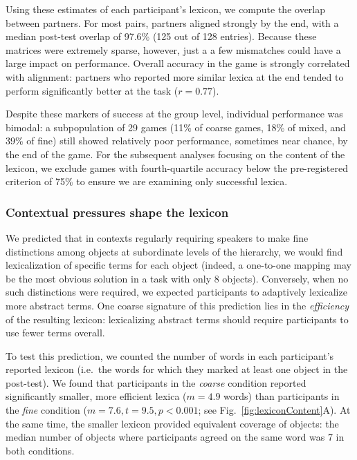 Using these estimates of each participant's lexicon, we compute the overlap between partners. 
For most pairs, partners aligned strongly by the end, with a median post-test overlap of 97.6\% (125 out of 128 entries). 
Because these matrices were extremely sparse, however, just a a few mismatches could have a large impact on performance. 
Overall accuracy in the game is strongly correlated with alignment: partners who reported more similar lexica at the end tended to perform significantly better at the task ($r = 0.77$).  

Despite these markers of success at the group level, individual performance was bimodal: a subpopulation of 29 games (11\% of coarse games, 18\% of mixed, and 39\% of fine) still showed relatively poor performance, sometimes near chance, by the end of the game. 
For the subsequent analyses focusing on the content of the lexicon, we exclude games with fourth-quartile accuracy below the pre-registered criterion of 75\% to ensure we are examining only successful lexica. 

\subsubsection{Contextual pressures shape the lexicon}

We predicted that in contexts regularly requiring speakers to make fine distinctions among objects at subordinate levels of the hierarchy, we would find lexicalization of specific terms for each object (indeed, a one-to-one mapping may be the most obvious solution in a task with only 8 objects). Conversely, when no such distinctions were required, we expected participants to adaptively lexicalize more abstract terms. One coarse signature of this prediction lies in the \emph{efficiency} of the resulting lexicon: lexicalizing abstract terms should require participants to use fewer terms overall.

To test this prediction, we counted the number of words in each participant's reported lexicon (i.e.\ the words for which they marked at least one object in the post-test). We found that participants in the \emph{coarse} condition reported significantly smaller, more efficient lexica ($m = 4.9$ words) than participants in the \emph{fine} condition ($m = 7.6, t = 9.5, p < 0.001$; see Fig.\ \ref{fig:lexiconContent}A). At the same time, the smaller lexicon provided equivalent coverage of objects: the median number of objects where participants agreed on the same word was 7 in both conditions. 

